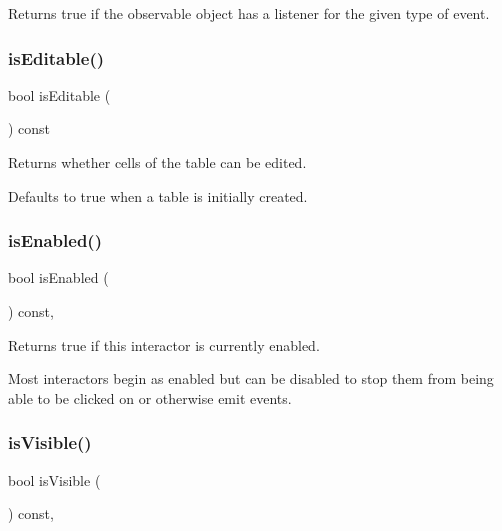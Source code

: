 Returns true if the observable object has a listener for the given type of event. 

\mbox{\label{classsgl_1_1GTable_a012b5afb54e037e6c5498cf0932a521b}} 
\subsubsection{\texorpdfstring{is\+Editable()}{isEditable()}}
{\footnotesize\ttfamily bool is\+Editable (\begin{DoxyParamCaption}{ }\end{DoxyParamCaption}) const\hspace{0.3cm}{\ttfamily [virtual]}}



Returns whether cells of the table can be edited. 

Defaults to true when a table is initially created. \mbox{\label{classsgl_1_1GInteractor_aacb819fb241851fd9fc045271baa4034}} 
\subsubsection{\texorpdfstring{is\+Enabled()}{isEnabled()}}
{\footnotesize\ttfamily bool is\+Enabled (\begin{DoxyParamCaption}{ }\end{DoxyParamCaption}) const\hspace{0.3cm}{\ttfamily [virtual]}, {\ttfamily [inherited]}}



Returns true if this interactor is currently enabled. 

Most interactors begin as enabled but can be disabled to stop them from being able to be clicked on or otherwise emit events. \mbox{\label{classsgl_1_1GInteractor_a9d8a6cfb13917785c143e74d40e4e2be}} 
\subsubsection{\texorpdfstring{is\+Visible()}{isVisible()}}
{\footnotesize\ttfamily bool is\+Visible (\begin{DoxyParamCaption}{ }\end{DoxyParamCaption}) const\hspace{0.3cm}{\ttfamily [virtual]}, {\ttfamily [inherited]}}



